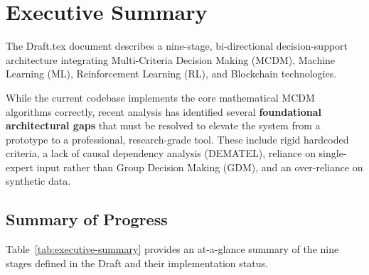 \documentclass[11pt]{article}
\begin{document}
\newpage
{}
\hypersetup{pageanchor=true}
\begingroup
\setlength{\parskip}{0pt}
\tableofcontents
\endgroup
\newpage
{}

\section{Executive Summary}

The Draft.tex document describes a nine-stage, bi-directional decision-support architecture integrating Multi-Criteria Decision Making (MCDM), Machine Learning (ML), Reinforcement Learning (RL), and Blockchain technologies. 

While the current codebase implements the core mathematical MCDM algorithms correctly, recent analysis has identified several \textbf{foundational architectural gaps} that must be resolved to elevate the system from a prototype to a professional, research-grade tool. These include rigid hardcoded criteria, a lack of causal dependency analysis (DEMATEL), reliance on single-expert input rather than Group Decision Making (GDM), and an over-reliance on synthetic data.

\subsection{Summary of Progress}

Table~\ref{tab:executive-summary} provides an at-a-glance summary of the nine stages defined in the Draft and their implementation status.
\end{document}
